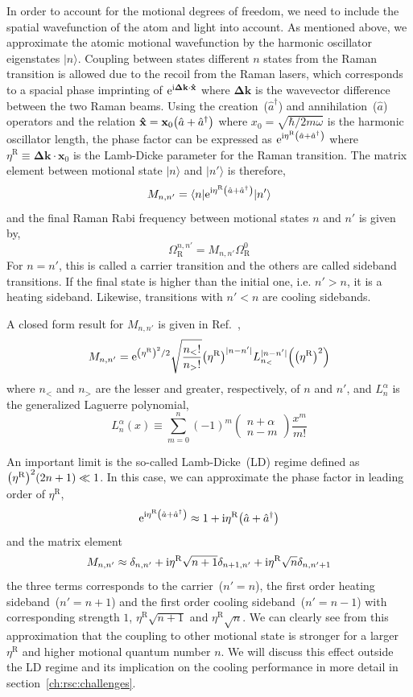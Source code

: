 In order to account for the motional degrees of freedom, we need to include the spatial
wavefunction of the atom and light into account.
As mentioned above, we approximate the atomic motional wavefunction by the harmonic oscillator
eigenstates $|n\rangle$. Coupling between states different $n$ states from the Raman transition
is allowed due to the recoil from the Raman lasers,
which corresponds to a spacial phase imprinting of $\mathrm{e}^{\mathrm{i}\mathbf{\Delta k}\cdot\mathbf{\hat x}}$
where $\mathbf{\Delta k}$ is the wavevector difference between the two Raman beams.
Using the creation~($\hat a^\dagger$) and annihilation~($\hat a$) operators and the relation
$\mathbf{\hat x}=\mathbf{x}_0{\left({\hat a+\hat a^\dagger}\right)}$ where $x_0=\sqrt{\hbar/2m\omega}$
is the harmonic oscillator length, the phase factor can be expressed as
$\mathrm{e}^{\mathrm{i}\eta^{\mathrm{R}}{\left({\hat a+\hat a^\dagger}\right)}}$ where $\eta^{\mathrm{R}}\equiv\mathbf{\Delta k}\cdot\mathbf{x}_0$
is the Lamb-Dicke parameter for the Raman transition.
The matrix element between motional state $|n\rangle$ and $|n'\rangle$ is therefore,
\[ M_{n,n'}=\langle n|\mathrm{e}^{\mathrm{i}\eta^{\mathrm{R}}{\left({\hat a+\hat a^\dagger}\right)}}|n'\rangle \]
and the final Raman Rabi frequency between motional states $n$ and $n'$ is given by,
\[ \Omega_{\mathrm{R}}^{n,n'}=M_{n,n'}\Omega_{\mathrm{R}}^0 \]
For $n=n'$, this is called a carrier transition and the others are called sideband transitions.
If the final state is higher than the initial one, i.e. $n'>n$, it is a heating sideband.
Likewise, transitions with $n'<n$ are cooling sidebands.

A closed form result for $M_{n,n'}$ is given in Ref.~\cite{wineland_experimental_1998},
\[ M_{n,n'}=\mathrm{e}^{{\left({\eta^{\mathrm{R}}}\right)}^2/2}\sqrt{\frac{n_<!}{n_>!}}{\left({\eta^{\mathrm{R}}}\right)}^{|n-n'|}L_{n_<}^{|n-n'|}{\left({{\left({\eta^{\mathrm{R}}}\right)}^2}\right)} \]
where $n_<$ and $n_>$ are the lesser and greater, respectively, of $n$ and $n'$,
and $L_n^\alpha$ is the generalized Laguerre polynomial,
\[ L_n^\alpha(x)\equiv\sum_{m=0}^n(-1)^m\begin{pmatrix}n+\alpha\\n-m\end{pmatrix}\frac{x^m}{m!} \]

An important limit is the so-called Lamb-Dicke~(LD) regime defined
as ${\left({\eta^{\mathrm{R}}}\right)}^2(2n+1)\ll 1$.
In this case, we can approximate the phase factor in leading order of $\eta^{\mathrm{R}}$,
\[ \mathrm{e}^{\mathrm{i}\eta^{\mathrm{R}}{\left({\hat a+\hat a^\dagger}\right)}}\approx1+\mathrm{i}\eta^{\mathrm{R}}{\left({\hat a+\hat a^\dagger}\right)} \]
and the matrix element
\[ M_{n,n'}\approx\delta_{n,n'}+\mathrm{i}\eta^{\mathrm{R}}\sqrt{n+1}\delta_{n+1,n'}+\mathrm{i}\eta^{\mathrm{R}}\sqrt{n}\delta_{n,n'+1} \]
the three terms corresponds to the carrier~($n'=n$),
the first order heating sideband~($n'=n+1$)
and the first order cooling sideband~($n'=n-1$) with corresponding strength
$1$, $\eta^{\mathrm{R}}\sqrt{n+1}$ and $\eta^{\mathrm{R}}\sqrt{n}$.
We can clearly see from this approximation that the coupling to other motional state
is stronger for a larger $\eta^{\mathrm{R}}$ and higher motional quantum number $n$.
We will discuss this effect outside the LD regime and its implication
on the cooling performance in more detail in section~\ref{ch:rsc:challenges}.

